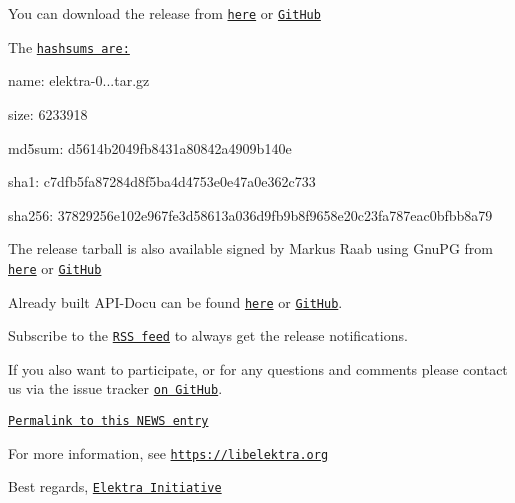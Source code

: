 You can download the release from \href{https://www.libelektra.org/ftp/elektra/releases/elektra-0.8.25.tar.gz}{\tt here} or \href{https://github.com/ElektraInitiative/ftp/blob/master/releases/elektra-0.8.25.tar.gz?raw=true}{\tt Git\+Hub}

The \href{https://github.com/ElektraInitiative/ftp/blob/master/releases/elektra-0.8.25.tar.gz.hashsum?raw=true}{\tt hashsums are\+:}


\begin{DoxyItemize}
\item name\+: elektra-\/0...\+tar.\+gz
\item size\+: 6233918
\item md5sum\+: d5614b2049fb8431a80842a4909b140e
\item sha1\+: c7dfb5fa87284d8f5ba4d4753e0e47a0e362c733
\item sha256\+: 37829256e102e967fe3d58613a036d9fb9b8f9658e20c23fa787eac0bfbb8a79
\end{DoxyItemize}

The release tarball is also available signed by Markus Raab using Gnu\+PG from \href{https://www.libelektra.org/ftp/elektra/releases/elektra-0.8.25.tar.gz.gpg}{\tt here} or \href{https://github.com/ElektraInitiative/ftp/blob/master/releases//elektra-0.8.25.tar.gz.gpg?raw=true}{\tt Git\+Hub}

Already built A\+P\+I-\/\+Docu can be found \href{https://doc.libelektra.org/api/0.8.25/html/}{\tt here} or \href{https://github.com/ElektraInitiative/doc/tree/master/api/0.8.25}{\tt Git\+Hub}.

Subscribe to the \href{https://www.libelektra.org/news/feed.rss}{\tt R\+SS feed} to always get the release notifications.

If you also want to participate, or for any questions and comments please contact us via the issue tracker \href{http://issues.libelektra.org}{\tt on Git\+Hub}.

\href{https://www.libelektra.org/news/0.8.25-release}{\tt Permalink to this N\+E\+WS entry}

For more information, see \href{https://libelektra.org}{\tt https\+://libelektra.\+org}

Best regards, \href{https://www.libelektra.org/developers/authors}{\tt Elektra Initiative} 